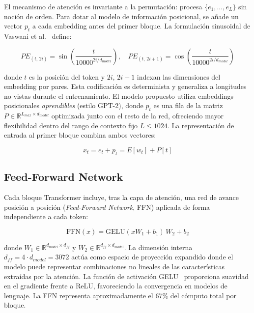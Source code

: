 El mecanismo de atención es invariante a la permutación: procesa $\{e_1, \ldots, e_L\}$ sin noción de orden. Para dotar al modelo de información posicional, se añade un vector $p_t$ a cada embedding antes del primer bloque. La formulación sinusoidal de Vaswani et al.~\cite{vaswani2017attention} define:

\begin{equation}
    PE_{(t,\,2i)} = \sin\!\left(\frac{t}{10000^{2i/d_{model}}}\right), \quad
    PE_{(t,\,2i+1)} = \cos\!\left(\frac{t}{10000^{2i/d_{model}}}\right)
\end{equation}

donde $t$ es la posición del token y $2i$, $2i{+}1$ indexan las dimensiones del embedding por pares. Esta codificación es determinista y generaliza a longitudes no vistas durante el entrenamiento. El modelo propuesto utiliza embeddings posicionales \textit{aprendibles} (estilo GPT-2), donde $p_t$ es una fila de la matriz $P \in \mathbb{R}^{L_{max} \times d_{model}}$ optimizada junto con el resto de la red, ofreciendo mayor flexibilidad dentro del rango de contexto fijo $L \leq 1024$. La representación de entrada al primer bloque combina ambos vectores:

\begin{equation}
    x_t = e_t + p_t = E[w_t] + P[t]
\end{equation}

\subsection{Feed-Forward Network}

Cada bloque Transformer incluye, tras la capa de atención, una red de avance posición a posición (\textit{Feed-Forward Network}, FFN) aplicada de forma independiente a cada token:

\begin{equation}
    \text{FFN}(x) = \text{GELU}(x W_1 + b_1)\, W_2 + b_2
\end{equation}

donde $W_1 \in \mathbb{R}^{d_{model} \times d_{ff}}$ y $W_2 \in \mathbb{R}^{d_{ff} \times d_{model}}$. La dimensión interna $d_{ff} = 4 \cdot d_{model} = 3072$ actúa como espacio de proyección expandido donde el modelo puede representar combinaciones no lineales de las características extraídas por la atención. La función de activación GELU~\cite{hendrycks2016gelu} proporciona suavidad en el gradiente frente a ReLU, favoreciendo la convergencia en modelos de lenguaje. La FFN representa aproximadamente el 67\% del cómputo total por bloque.

